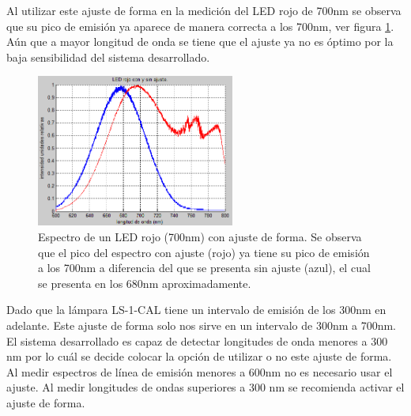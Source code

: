 Al utilizar este ajuste de forma en la medición del LED rojo de 700nm se observa que su pico de emisión ya aparece de manera correcta a los 700nm, ver figura \ref{fig:ledrojoa}. Aún que a mayor longitud de onda se tiene que el ajuste ya no es óptimo por la baja sensibilidad del sistema desarrollado. 
\begin{figure}[h]
	\centering
	\includegraphics[width=0.8\linewidth,height=5cm]{Imagenes/4/LEDrojoA}
	\caption[Espectro de un LED rojo (700nm) con ajuste de forma.]{Espectro de un LED rojo (700nm) con ajuste de forma. Se observa que el pico del espectro con ajuste (rojo) ya tiene su pico de emisión a los 700nm a diferencia del que se presenta sin ajuste (azul), el cual se presenta en los 680nm aproximadamente.}
	\label{fig:ledrojoa}
\end{figure}

Dado que la lámpara LS-1-CAL tiene un intervalo de emisión de los 300nm en adelante. Este ajuste de forma solo nos sirve en un intervalo de 300nm a 700nm. El sistema desarrollado es capaz de detectar longitudes de onda menores a 300 nm por lo cuál se decide colocar la opción de utilizar o no este ajuste de forma. Al medir espectros de línea de emisión menores a 600nm no es necesario usar el ajuste. Al medir longitudes de ondas superiores a 300 nm se recomienda activar el ajuste de forma.



 
